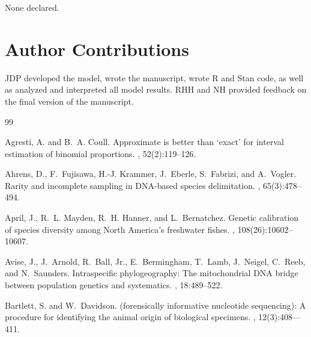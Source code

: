 \documentclass[12pt]{article}
\begin{document}
None declared.

\section*{Author Contributions}

JDP developed the model, wrote the manuscript, wrote R and Stan code, as well as analyzed and interpreted all model results. RHH and NH provided feedback on the final version of the manuscript. 

\begin{thebibliography}{99}

Agresti, A. and B.~A. Coull\leavevmode\nopagebreak{}.
\newblock Approximate is better than `exact' for interval estimation of
  binomial proportions.
, 52(2):119--126.

Ahrens, D., F.~Fujisawa, H.-J. Krammer, J.~Eberle, S.~Fabrizi, and
  A.~Vogler\leavevmode\nopagebreak{}.
\newblock Rarity and incomplete sampling in {DNA}-based species delimitation.
, 65(3):478--494.

April, J., R.~L. Mayden, R.~H. Hanner, and
  L.~Bernatchez\leavevmode\nopagebreak{}.
\newblock Genetic calibration of species diversity among {N}orth {A}merica's
  freshwater fishes.
,
  108(26):10602--10607.

Avise, J., J.~Arnold, R.~Ball, Jr., E.~Bermingham, T.~Lamb, J.~Neigel, C.~Reeb,
  and N.~Saunders\leavevmode\nopagebreak{}.
\newblock Intraspecific phylogeography: The mitochondrial {DNA} bridge between
  population genetics and systematics.
, 18:489--522.

Bartlett, S. and W.~Davidson\leavevmode\nopagebreak{}.
 (forensically informative nucleotide sequencing): {A}
  procedure for identifying the animal origin of biological specimens.
, 12(3):408—411.


\end{thebibliography}
\end{document}
